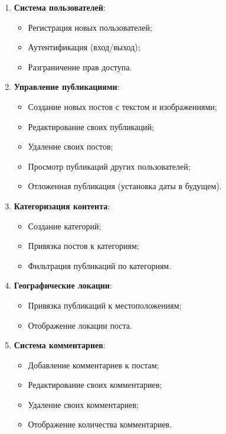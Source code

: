 \documentclass[pract,och,bachelor]{SCWorks}
\begin{document}
\begin{enumerate}
    \item \textbf{Система пользователей}:
    \begin{itemize}
        \item Регистрация новых пользователей;
        \item Аутентификация (вход/выход);
        \item Разграничение прав доступа.
    \end{itemize}
    
    \item \textbf{Управление публикациями}:
    \begin{itemize}
        \item Создание новых постов с текстом и изображениями;
        \item Редактирование своих публикаций;
        \item Удаление своих постов;
        \item Просмотр публикаций других пользователей;
        \item Отложенная публикация (установка даты в будущем).
    \end{itemize}
    
    \item \textbf{Категоризация контента}:
    \begin{itemize}
        \item Создание категорий;
        \item Привязка постов к категориям;
        \item Фильтрация публикаций по категориям.
    \end{itemize}
    
    \item \textbf{Географические локации}:
    \begin{itemize}
        \item Привязка публикаций к местоположениям;
        \item Отображение локации поста.
    \end{itemize}
    
    \item \textbf{Система комментариев}:
    \begin{itemize}
        \item Добавление комментариев к постам;
        \item Редактирование своих комментариев;
        \item Удаление своих комментариев;
        \item Отображение количества комментариев.
    \end{itemize}
    

\end{enumerate}
\end{document}
